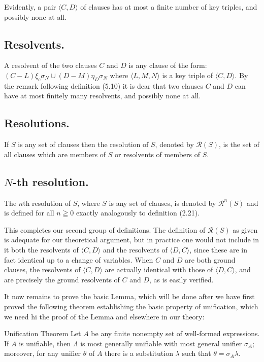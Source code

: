 \documentclass[8pt]{extarticle}
\begin{document}
Evidently, a pair $\langle C, D\rangle$ of clauses has at most a finite number of key triples, and possibly none at all.

\subsection{Resolvents.}
A resolvent of the two clauses $C$ and $D$ is any clause of the
form: $(C - L)\xi_c\sigma_N \cup (D - M)\eta_D\sigma_N$ where $\langle L, M, N\rangle$ is a key triple of $\langle C, D\rangle$.
By the remark following definition (5.10) it is dear that two clauses $C$ and $D$ can have at most finitely many resolvents, and possibly none at all.

\subsection{Resolutions.}
If $S$ is any set of clauses then the resolution of $S$, denoted
by $\mathcal{R}(S)$, is the set of all clauses which are members of $S$ or resolvents of members of $S$.

\subsection{$N$-th resolution.}
The $n$\-th resolution of $S$, where $S$ is any set of clauses,
is denoted by $\mathcal{R}^n(S)$ and is defined for all $n \geqq 0$ exactly analogously to definition (2.21).

This completes our second group of definitions. The definition of $\mathcal{R}(S)$ as given is adequate for our theoretical argument, but in practice one would not include in it both the resolvents of $\langle C, D\rangle$ and the resolvents of $\langle D, C\rangle$, since these are in fact identical up to a change of variables. When $C$ and $D$ are both ground clauses, the resolvents of $\langle C, D\rangle$ are actually identical with those of $\langle D, C\rangle$, and are precisely the ground resolvents of $C$ and $D$, as is easily verified.

It now remains to prove the basic Lemma, which will be done after we have
first proved the following theorem establishing the basic property of unification, which we need hi the proof of the Lemma and elsewhere in our theory: 


\begin{unificationTheorem}{Unification Theorem}\label{unificationTheorem}
Let $A$ be any finite nonempty set of well-formed expressions. If $A$ is unifiable, then $\Lambda$ is most generally unifiable with most general
unifier $\sigma_A$; moreover, for any unifier $\theta$ of $A$ there is a substitution $\lambda$ such that
$\theta = \sigma_A\lambda$.
\end{unificationTheorem}
\end{document}
